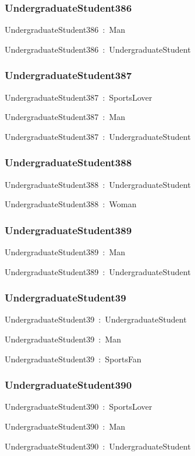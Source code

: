 \documentclass{article}
\begin{document}
\subsubsection*{UndergraduateStudent386}

UndergraduateStudent386~:~Man

UndergraduateStudent386~:~UndergraduateStudent

\subsubsection*{UndergraduateStudent387}

UndergraduateStudent387~:~SportsLover

UndergraduateStudent387~:~Man

UndergraduateStudent387~:~UndergraduateStudent

\subsubsection*{UndergraduateStudent388}

UndergraduateStudent388~:~UndergraduateStudent

UndergraduateStudent388~:~Woman

\subsubsection*{UndergraduateStudent389}

UndergraduateStudent389~:~Man

UndergraduateStudent389~:~UndergraduateStudent

\subsubsection*{UndergraduateStudent39}

UndergraduateStudent39~:~UndergraduateStudent

UndergraduateStudent39~:~Man

UndergraduateStudent39~:~SportsFan

\subsubsection*{UndergraduateStudent390}

UndergraduateStudent390~:~SportsLover

UndergraduateStudent390~:~Man

UndergraduateStudent390~:~UndergraduateStudent
\end{document}
